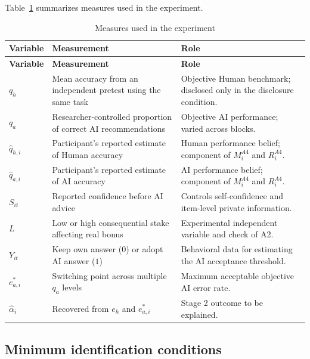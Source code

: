 \documentclass[11pt,a4paper]{article}
\begin{document}
Table~\ref{tab:measures} summarizes measures used in the experiment.

\begin{longtable}{>{\RaggedRight\arraybackslash}p{}>{\RaggedRight\arraybackslash}p{}>{\RaggedRight\arraybackslash}p{}}
\caption{Measures used in the experiment}\label{tab:measures}\\
\toprule
\textbf{Variable} & \textbf{Measurement} & \textbf{Role}\\
\midrule
\endfirsthead
\toprule
\textbf{Variable} & \textbf{Measurement} & \textbf{Role}\\
\midrule
\endhead
$q_h$ & Mean accuracy from an independent pretest using the same task & Objective Human benchmark; disclosed only in the disclosure condition.\\
$q_a$ & Researcher-controlled proportion of correct AI recommendations & Objective AI performance; varied across blocks.\\
$\widehat q_{h,i}$ & Participant's reported estimate of Human accuracy & Human performance belief; component of $M_i^{A4}$ and $R_i^{A4}$.\\
$\widehat q_{a,i}$ & Participant's reported estimate of AI accuracy & AI performance belief; component of $M_i^{A4}$ and $R_i^{A4}$.\\
$S_{it}$ & Reported confidence before AI advice & Controls self-confidence and item-level private information.\\
$L$ & Low or high consequential stake affecting real bonus & Experimental independent variable and check of A2.\\
$Y_{it}$ & Keep own answer ($0$) or adopt AI answer ($1$) & Behavioral data for estimating the AI acceptance threshold.\\
$e_{a,i}^{*}$ & Switching point across multiple $q_a$ levels & Maximum acceptable objective AI error rate.\\
$\widehat\alpha_i$ & Recovered from $e_h$ and $e_{a,i}^{*}$ & Stage 2 outcome to be explained.\\
\bottomrule
\end{longtable}

\subsection{Minimum identification conditions}
\end{document}
